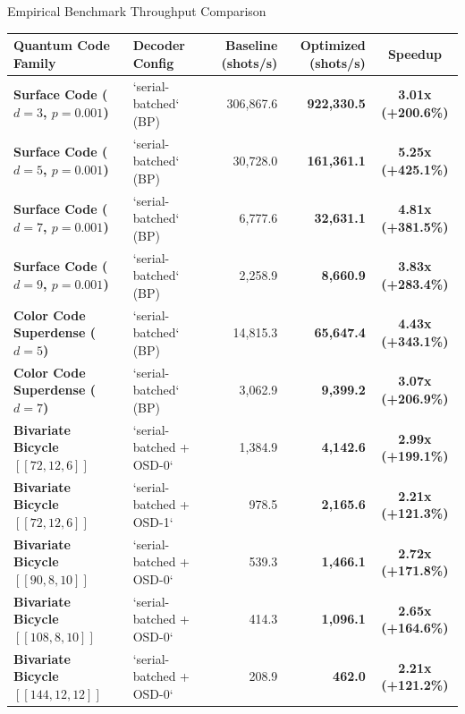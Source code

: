 \begin{frame}{Empirical Benchmark Throughput Comparison}
    \centering
    \scriptsize
    \begin{tabular}{l l r r c}
        \toprule
        \textbf{Quantum Code Family} & \textbf{Decoder Config} & \textbf{Baseline (shots/s)} & \textbf{Optimized (shots/s)} & \textbf{Speedup} \\
        \midrule
        \textbf{Surface Code ($d=3$, $p=0.001$)} & `serial-batched` (BP) & 306,867.6 & \textbf{922,330.5} & \textbf{3.01x (+200.6\%)} \\
        \textbf{Surface Code ($d=5$, $p=0.001$)} & `serial-batched` (BP) & 30,728.0 & \textbf{161,361.1} & \textbf{5.25x (+425.1\%)} \\
        \textbf{Surface Code ($d=7$, $p=0.001$)} & `serial-batched` (BP) & 6,777.6 & \textbf{32,631.1} & \textbf{4.81x (+381.5\%)} \\
        \textbf{Surface Code ($d=9$, $p=0.001$)} & `serial-batched` (BP) & 2,258.9 & \textbf{8,660.9} & \textbf{3.83x (+283.4\%)} \\
        \midrule
        \textbf{Color Code Superdense ($d=5$)} & `serial-batched` (BP) & 14,815.3 & \textbf{65,647.4} & \textbf{4.43x (+343.1\%)} \\
        \textbf{Color Code Superdense ($d=7$)} & `serial-batched` (BP) & 3,062.9 & \textbf{9,399.2} & \textbf{3.07x (+206.9\%)} \\
        \midrule
        \textbf{Bivariate Bicycle $[[72,12,6]]$} & `serial-batched + OSD-0` & 1,384.9 & \textbf{4,142.6} & \textbf{2.99x (+199.1\%)} \\
        \textbf{Bivariate Bicycle $[[72,12,6]]$} & `serial-batched + OSD-1` & 978.5 & \textbf{2,165.6} & \textbf{2.21x (+121.3\%)} \\
        \textbf{Bivariate Bicycle $[[90,8,10]]$} & `serial-batched + OSD-0` & 539.3 & \textbf{1,466.1} & \textbf{2.72x (+171.8\%)} \\
        \textbf{Bivariate Bicycle $[[108,8,10]]$} & `serial-batched + OSD-0` & 414.3 & \textbf{1,096.1} & \textbf{2.65x (+164.6\%)} \\
        \textbf{Bivariate Bicycle $[[144,12,12]]$} & `serial-batched + OSD-0` & 208.9 & \textbf{462.0} & \textbf{2.21x (+121.2\%)} \\
        \bottomrule
    \end{tabular}
\end{frame}

